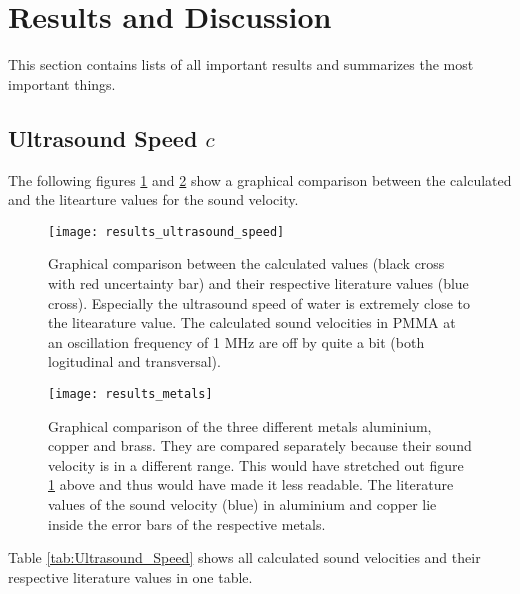 \section{Results and Discussion}
\label{sec:Results_and_Discussion}
This section contains lists of all important results and summarizes the most important things.

\subsection{Ultrasound Speed $c$}
\label{subsec:Ultrasound_Speed}
The following figures \ref{fig:results_ultrasound_speed} and \ref{fig:results_metals} show a graphical comparison between the calculated and the litearture values for the sound velocity.

\begin{figure}[H]
	\centering
	\texttt{[image: results\_ultrasound\_speed]}
	\caption{Graphical comparison between the calculated values (black cross with red uncertainty bar) and their respective literature values (blue cross). Especially the ultrasound speed of water is extremely close to the litearature value. The calculated sound velocities in PMMA at an oscillation frequency of 1 MHz are off by quite a bit (both logitudinal and transversal).}
	\label{fig:results_ultrasound_speed}
\end{figure}

\begin{figure}[H]
	\centering
	\texttt{[image: results\_metals]}
	\caption{Graphical comparison of the three different metals aluminium, copper and brass. They are compared separately because their sound velocity is in a different range. This would have stretched out figure \ref{fig:results_ultrasound_speed} above and thus would have made it less readable. The literature values of the sound velocity (blue) in aluminium and copper lie inside the error bars of the respective metals.}
	\label{fig:results_metals}
\end{figure}

Table \ref{tab:Ultrasound_Speed} shows all calculated sound velocities and their respective literature values in one table.

